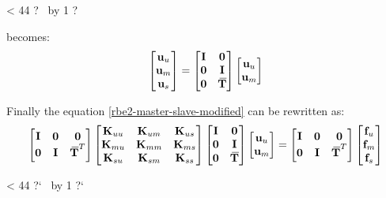 \documentclass[10pt,b5paper,titlepage]{book}
\newcommand{\m}{\mathbf}
\newcommand{\closure}[2][3]{%
{}\mkern#1mu\overline{\mkern-#1mu#2}}
\newcommand{\repeatit}[3][10]{%
    \myloopcounter1%
    \loop\ifnum\myloopcounter < #1
    #2#3%
    \advance\myloopcounter by 1%
    \repeat%
    #2%
}
\newenvironment{qbox}
{
\begin{center}
    \repeatit[44]{?}{\ }
\end{center}
}
{
\begin{center}
    \repeatit[44]{?`}{\ }
\end{center}
}
\begin{document}
\begin{qbox}
    becomes:
    \begin{equation}
        \begin{bmatrix}
            \m{u}_u  \\
            \m{u}_m \\
            \m{u}_s \\
        \end{bmatrix}
        = \begin{bmatrix}
            \m{I} & \m{0} \\
            \m{0} & \m{I} \\
            \m{0} & \m{\closure{T}} \\
        \end{bmatrix}
        \begin{bmatrix}
            \m{u}_u \\
            \m{u}_m \\
        \end{bmatrix}
    \end{equation}


    Finally the equation \eqref{rbe2-master-slave-modified} can be rewritten as:
    \begin{equation}
        \begin{bmatrix}
            \m{I} & \m{0} & \m{0} \\
            \m{0} & \m{I} & \m{\closure{T}}^T \\
        \end{bmatrix}
        \begin{bmatrix}
            \m{K}_{uu} & \m{K}_{um} & \m{K}_{us} \\
            \m{K}_{mu} & \m{K}_{mm} & \m{K}_{ms} \\
            \m{K}_{su} & \m{K}_{sm} & \m{K}_{ss} \\
        \end{bmatrix}
        \begin{bmatrix}
            \m{I} & \m{0} \\
            \m{0} & \m{I} \\
            \m{0} & \m{\closure{T}} \\
        \end{bmatrix}
        \begin{bmatrix}
            \m{u}_u \\
            \m{u}_m \\
        \end{bmatrix}
        = \begin{bmatrix}
            \m{I} & \m{0} & \m{0} \\
            \m{0} & \m{I} & \m{\closure{T}}^T \\
        \end{bmatrix}
        \begin{bmatrix}
            \m{f}_u \\
            \m{f}_m \\
            \m{f}_s \\
        \end{bmatrix}
    \end{equation}


\end{qbox}
\end{document}
